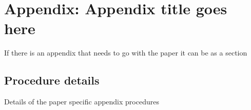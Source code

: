 
\printbibliography[heading=subbibnumbered]

% 
%     

\section{Appendix: Appendix title goes here}
If there is an appendix that needs to go with the paper it can be as a section \autocite{zieglerLecturesPolytopes1995}

\subsection{Procedure details}
Details of the paper specific appendix procedures

\autocite{buiEveryGeneratingPolytope2023}
